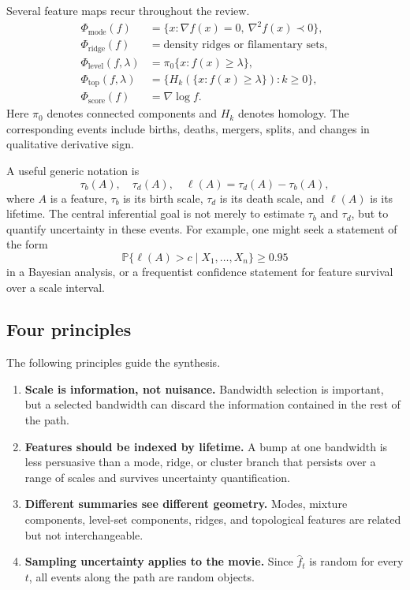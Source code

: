 \documentclass[preprint]{imsart}
\theoremstyle{plain}
\theoremstyle{definition}
\newcommand{\Prob}{\mathbb{P}}
\newcommand{\fhat}{\widehat f}
\begin{document}
Several feature maps recur throughout the review.
\begin{align*}
  \Phi_{\mathrm{mode}}(f) &= \{x:\nabla f(x)=0,\ \nabla^2 f(x)\prec 0\},\\
  \Phi_{\mathrm{ridge}}(f) &= \text{density ridges or filamentary sets},\\
  \Phi_{\mathrm{level}}(f,\lambda) &= \pi_0\{x:f(x)\ge\lambda\},\\
  \Phi_{\mathrm{top}}(f,\lambda) &= \{H_k(\{x:f(x)\ge\lambda\}):k\ge0\},\\
  \Phi_{\mathrm{score}}(f) &= \nabla\log f.
\end{align*}
Here $\pi_0$ denotes connected components and $H_k$ denotes homology. The corresponding events include births, deaths, mergers, splits, and changes in qualitative derivative sign.

A useful generic notation is
\[
  \tau_b(A),\quad \tau_d(A),\quad \ell(A)=\tau_d(A)-\tau_b(A),
\]
where $A$ is a feature, $\tau_b$ is its birth scale, $\tau_d$ is its death scale, and $\ell(A)$ is its lifetime. The central inferential goal is not merely to estimate $\tau_b$ and $\tau_d$, but to quantify uncertainty in these events. For example, one might seek a statement of the form
\[
  \Prob\{\ell(A)>c\mid X_1,\ldots,X_n\}\ge 0.95
\]
in a Bayesian analysis, or a frequentist confidence statement for feature survival over a scale interval.

\subsection{Four principles}
\label{subsec:principles}

The following principles guide the synthesis.

\begin{enumerate}[(1)]
\item \textbf{Scale is information, not nuisance.} Bandwidth selection is important, but a selected bandwidth can discard the information contained in the rest of the path.
\item \textbf{Features should be indexed by lifetime.} A bump at one bandwidth is less persuasive than a mode, ridge, or cluster branch that persists over a range of scales and survives uncertainty quantification.
\item \textbf{Different summaries see different geometry.} Modes, mixture components, level-set components, ridges, and topological features are related but not interchangeable.
\item \textbf{Sampling uncertainty applies to the movie.} Since $\fhat_t$ is random for every $t$, all events along the path are random objects.
\end{enumerate}
\end{document}
